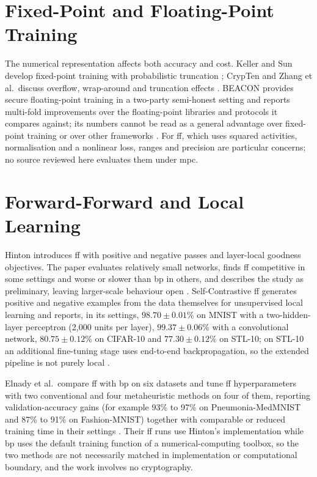 \section{Fixed-Point and Floating-Point Training}\label{sec:lr-numeric}
The numerical representation affects both accuracy and cost. Keller and Sun develop fixed-point training with probabilistic truncation \cite{keller2022sqt}; CrypTen and Zhang et al.\ discuss overflow, wrap-around and truncation effects \cite{knott2021crypten,zhang2025efficient}. BEACON provides secure floating-point training in a two-party semi-honest setting and reports multi-fold improvements over the floating-point libraries and protocols it compares against; its numbers cannot be read as a general advantage over fixed-point training or over other frameworks \cite{rathee2023beacon}. For \ac{ff}, which uses squared activities, normalisation and a nonlinear loss, ranges and precision are particular concerns; no source reviewed here evaluates them under \ac{mpc}.

\section{Forward-Forward and Local Learning}\label{sec:lr-ff}
Hinton introduces \ac{ff} with positive and negative passes and layer-local goodness objectives. The paper evaluates relatively small networks, finds \ac{ff} competitive in some settings and worse or slower than \ac{bp} in others, and describes the study as preliminary, leaving larger-scale behaviour open \cite{hinton2022ff}. Self-Contrastive \ac{ff} generates positive and negative examples from the data themselves for unsupervised local learning and reports, in its settings, $98.70\pm0.01\%$ on MNIST with a two-hidden-layer perceptron (2{,}000 units per layer), $99.37\pm0.06\%$ with a convolutional network, $80.75\pm0.12\%$ on CIFAR-10 and $77.30\pm0.12\%$ on STL-10; on STL-10 an additional fine-tuning stage uses end-to-end backpropagation, so the extended pipeline is not purely local \cite{chen2025scff}.

Elnady et al.\ compare \ac{ff} with \ac{bp} on six datasets and tune \ac{ff} hyperparameters with two conventional and four metaheuristic methods on four of them, reporting validation-accuracy gains (for example 93\% to 97\% on Pneumonia-MedMNIST and 87\% to 91\% on Fashion-MNIST) together with comparable or reduced training time in their settings \cite{elnady2026ff}. Their \ac{ff} runs use Hinton's implementation while \ac{bp} uses the default training function of a numerical-computing toolbox, so the two methods are not necessarily matched in implementation or computational boundary, and the work involves no cryptography.

